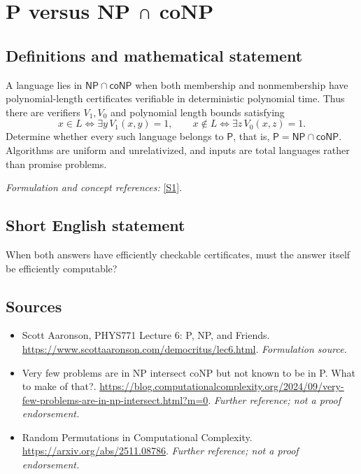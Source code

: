 \documentclass[11pt]{article}
\begin{document}
\section*{\texorpdfstring{P versus NP ∩ coNP}{P versus NP ∩ coNP}}\label{30006687}
\subsection{Definitions and mathematical statement}
A language lies in $\mathsf{NP}\cap\mathsf{coNP}$ when both membership and nonmembership have polynomial-length certificates verifiable in deterministic polynomial time. Thus there are verifiers $V_1,V_0$ and polynomial length bounds satisfying
\[
 x\in L\iff\exists y\,V_1(x,y)=1,\qquad
 x\notin L\iff\exists z\,V_0(x,z)=1.
\]
Determine whether every such language belongs to $\mathsf P$, that is, $\mathsf P=\mathsf{NP}\cap\mathsf{coNP}$. Algorithms are uniform and unrelativized, and inputs are total languages rather than promise problems.
\par\smallskip\textit{Formulation and concept references:} \href{https://www.scottaaronson.com/democritus/lec6.html}{[S1]}.

\subsection{Short English statement}
When both answers have efficiently checkable certificates, must the answer itself be efficiently computable?
\subsection{Sources}
\begin{itemize}
\item[S1]Scott Aaronson, PHYS771 Lecture 6: P, NP, and Friends.
\url{https://www.scottaaronson.com/democritus/lec6.html}.
\textit{Formulation source.}
\item[S2]Very few problems are in NP intersect coNP but not known to be in P. What to make of that?.
\url{https://blog.computationalcomplexity.org/2024/09/very-few-problems-are-in-np-intersect.html?m=0}.
\textit{Further reference; not a proof endorsement.}
\item[S3]Random Permutations in Computational Complexity.
\url{https://arxiv.org/abs/2511.08786}.
\textit{Further reference; not a proof endorsement.}
\end{itemize}
\end{document}
